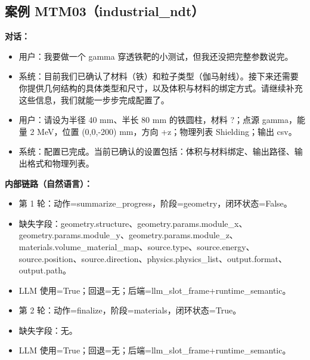 \documentclass[11pt]{ctexart}
\begin{document}
\subsection{案例 MTM03（industrial\_ndt）}
\textbf{对话：}
\begin{itemize}
\item 用户：我要做一个 gamma 穿透铁靶的小测试，但我还没把完整参数说完。
\item 系统：目前我们已确认了材料（铁）和粒子类型（伽马射线）。接下来还需要你提供几何结构的具体类型和尺寸，以及体积与材料的绑定方式。请继续补充这些信息，我们就能一步步完成配置了。
\item 用户：请设为半径 40 mm、半长 80 mm 的铁圆柱，材料 ?；点源 gamma，能量 2 MeV，位置 (0,0,-200) mm，方向 +z；物理列表 Shielding；输出 csv。
\item 系统：配置已完成。当前已确认的设置包括：体积与材料绑定、输出路径、输出格式和物理列表。
\end{itemize}
\textbf{内部链路（自然语言）：}
\begin{itemize}
\item 第 1 轮：动作=summarize\_progress，阶段=geometry，闭环状态=False。
\item 缺失字段：geometry.structure、geometry.params.module\_x、geometry.params.module\_y、geometry.params.module\_z、materials.volume\_material\_map、source.type、source.energy、source.position、source.direction、physics.physics\_list、output.format、output.path。
\item LLM 使用=True；回退=无；后端=llm\_slot\_frame+runtime\_semantic。
\item 第 2 轮：动作=finalize，阶段=materials，闭环状态=True。
\item 缺失字段：无。
\item LLM 使用=True；回退=无；后端=llm\_slot\_frame+runtime\_semantic。
\end{itemize}
\end{document}
